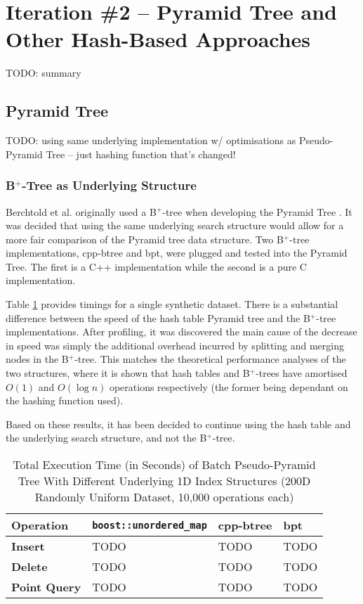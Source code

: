 \section{Iteration \#2 -- Pyramid Tree and Other Hash-Based Approaches}

TODO: summary

\subsection{Pyramid Tree}

TODO: using same underlying implementation w/ optimisations as Pseudo-Pyramid Tree -- just hashing function that's changed!

\subsubsection{B${}^+$-Tree as Underlying Structure}

Berchtold et al. originally used a B${}^{+}$-tree when developing the Pyramid Tree \cite{pyramid-tree}. It was decided that using the same underlying search structure would allow for a more fair comparison of the Pyramid tree data structure. Two B${}^{+}$-tree implementations, cpp-btree\cite{cpp-btree} and bpt\cite{bpt}, were plugged and tested into the Pyramid Tree. The first is a C++ implementation while the second is a pure C implementation.

Table \ref{tab:hashtable-bplus-time-comparison} provides timings for a single synthetic dataset. There is a substantial difference between the speed of the hash table Pyramid tree and the B${}^{+}$-tree implementations. After profiling, it was discovered the main cause of the decrease in speed was simply the additional overhead incurred by splitting and merging nodes in the B${}^{+}$-tree. This matches the theoretical performance analyses of the two structures, where it is shown that hash tables and B${}^{+}$-trees have amortised $O(1)$ and $O(\log n)$ operations respectively (the former being dependant on the hashing function used).

Based on these results, it has been decided to continue using the hash table and the underlying search structure, and not the B${}^{+}$-tree.

\begin{table}
	\centering
	\begin{tabular}{|l|l|l|l|}
		\hline
		\textbf{Operation} & \texttt{boost::unordered\_map} & cpp-btree & bpt \\
		\hline
		\textbf{Insert} & TODO & TODO & TODO \\
		\textbf{Delete} & TODO & TODO & TODO \\
		\textbf{Point Query} & TODO & TODO & TODO \\
		\hline
	\end{tabular}
	\caption{Total Execution Time (in Seconds) of Batch Pseudo-Pyramid Tree With Different Underlying 1D Index Structures (200D Randomly Uniform Dataset, 10,000 operations each)}
	\label{tab:hashtable-bplus-time-comparison}
\end{table}

